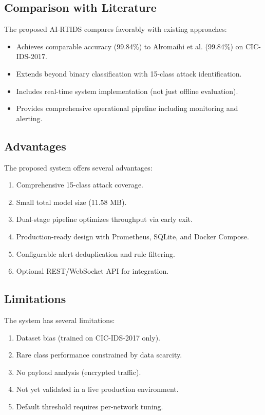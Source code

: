 \documentclass[12pt,a4paper]{report}
\begin{document}
\subsection{Comparison with Literature}

The proposed AI-RTIDS compares favorably with existing approaches:

\begin{itemize}
    \item Achieves comparable accuracy (99.84\%) to Alromaihi et al. (99.84\%) on CIC-IDS-2017.
    \item Extends beyond binary classification with 15-class attack identification.
    \item Includes real-time system implementation (not just offline evaluation).
    \item Provides comprehensive operational pipeline including monitoring and alerting.
\end{itemize}

\subsection{Advantages}

The proposed system offers several advantages:

\begin{enumerate}
    \item Comprehensive 15-class attack coverage.
    \item Small total model size (11.58 MB).
    \item Dual-stage pipeline optimizes throughput via early exit.
    \item Production-ready design with Prometheus, SQLite, and Docker Compose.
    \item Configurable alert deduplication and rule filtering.
    \item Optional REST/WebSocket API for integration.
\end{enumerate}

\subsection{Limitations}

The system has several limitations:

\begin{enumerate}
    \item Dataset bias (trained on CIC-IDS-2017 only).
    \item Rare class performance constrained by data scarcity.
    \item No payload analysis (encrypted traffic).
    \item Not yet validated in a live production environment.
    \item Default threshold requires per-network tuning.
\end{enumerate}
\end{document}
